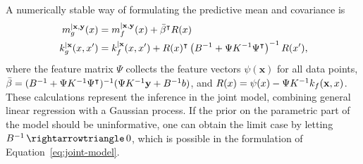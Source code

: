 A numerically stable way of formulating the predictive mean and covariance is
\cite[]{Rasmussen.Williams:2006:Gaussian}
\begin{subequations}
\label{eq:joint-model}
\begin{align}
   m_g^{|\mathbf{x},\mathbf{y}}(x) &= m_f^{|\mathbf{x},\mathbf{y}}(x) + \bar
\beta  ^{\intercal} R(x)\\
   k_g^{|\mathbf{x}}(x,x') &= k_f^{|\mathbf{x}}(x,x') + R(x)^{\intercal}\left(B^{-1} +
  \Psi K^{-1} \Psi^{\intercal}\right)^{-1} R(x'),
\end{align}
\end{subequations}
where the feature matrix $\Psi$ collects the feature vectors $\psi(\mathbf{x})$
for all
data points, $\bar \beta = (B^{-1} + \Psi K^{-1} \Psi^{\intercal})^{-1} (\Psi K^{-1}
\mathbf{y} + B^{-1} b)$, and $R(x) = \psi(x) - \Psi K^{-1}
k_f(\mathbf{x},x)$. These calculations represent the inference in the joint
model,
combining general linear regression with a Gaussian process. If the prior on
the parametric part of the model should be uninformative, one can obtain the
limit case by letting $B\inv \to 0$, which is possible in the formulation of
Equation~\eqref{eq:joint-model}.
